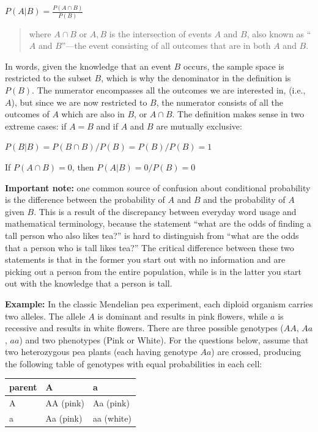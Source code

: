 \documentclass[
  letterpaper,
  DIV=11,
  numbers=noendperiod]{scrreprt}
\begin{document}
\(P(A \vert B) = \frac{P(A \cap B)}{P(B)}\)

\begin{quote}
where \(A \cap B\) or \(A, B\) is the intersection of events \(A\) and
\(B\), also known as ``\(A\) and \(B\)''---the event consisting of all
outcomes that are in both \(A\) and \(B\).
\end{quote}

In words, given the knowledge that an event \(B\) occurs, the sample
space is restricted to the subset \(B\), which is why the denominator in
the definition is \(P(B)\). The numerator encompasses all the outcomes
we are interested in, (i.e., \(A\)), but since we are now restricted to
\(B\), the numerator consists of all the outcomes of \(A\) which are
also in \(B\), or \(A \cap B\). The definition makes sense in two
extreme cases: if \(A = B\) and if \(A\) and \(B\) are mutually
exclusive:

\(P(B\vert B) = P(B \cap B) /P(B) = P(B)/P(B) = 1\)

If \(P(A\cap B) = 0\), then \(P(A\vert B) = 0/P(B) = 0\)

\textbf{Important note:} one common source of confusion about
conditional probability is the difference between the probability of
\(A\) and \(B\) and the probability of \(A\) given \(B\). This is a
result of the discrepancy between everyday word usage and mathematical
terminology, because the statement ``what are the odds of finding a tall
person who also likes tea?'' is hard to distinguish from ``what are the
odds that a person who is tall likes tea?'' The critical difference
between these two statements is that in the former you start out with no
information and are picking out a person from the entire population,
while is in the latter you start out with the knowledge that a person is
tall.

\textbf{Example:} In the classic Mendelian pea experiment, each diploid
organism carries two alleles. The allele \(A\) is dominant and results
in pink flowers, while \(a\) is recessive and results in white flowers.
There are three possible genotypes (\(AA\), \(Aa\), \(aa\)) and two
phenotypes (Pink or White). For the questions below, assume that two
heterozygous pea plants (each having genotype \(Aa\)) are crossed,
producing the following table of genotypes with equal probabilities in
each cell:

\begin{longtable}[]{@{}lll@{}}
\toprule()
parent & A & a \\
\midrule()
\endhead
A & AA (pink) & Aa (pink) \\
a & Aa (pink) & aa (white) \\
\bottomrule()
\end{longtable}
\end{document}

